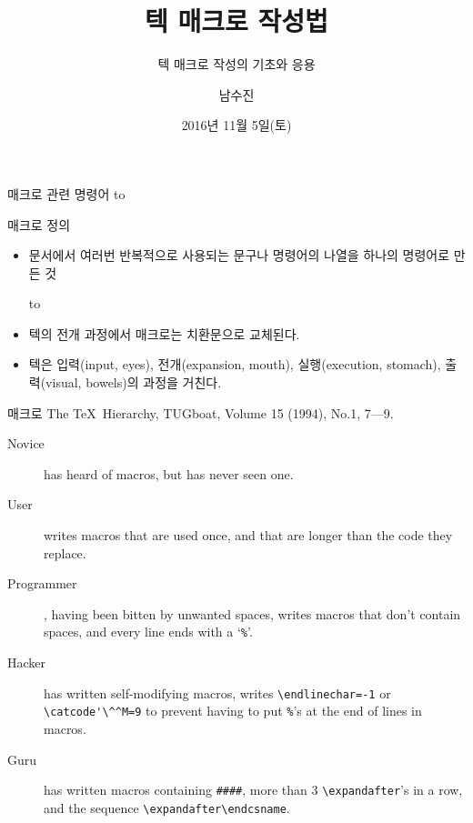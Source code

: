 \documentclass{beamer}
\title{텍 매크로 작성법}
\subtitle{텍 매크로 작성의 기초와 응용}
\author{남수진}
\date{2016년 11월 5일(토)}
\institute{
  2016 공주대학교 문서작성 워크숍 2016\\
  공주대학교 인문사회과학관 1층 컴퓨터실 107호}
\begin{document}
\maketitle


%
\begin{frame}{매크로 관련 명령어}
  \vspace{4mm}
  \hbox to
\end{frame}


%
\begin{frame}[fragile]{매크로 정의}
  \begin{itemize}
  \item 문서에서 여러번 반복적으로 사용되는 문구나 명령어의 나열을 하나의 명령어로 만든 것
    
    \medskip
    \hbox to
    \medskip
  \item 텍의 전개 과정에서 매크로는 치환문으로 교체된다.
  \item 텍은 입력(input, eyes), 전개(expansion, mouth),
    실행(execution, stomach), 출력(visual, bowels)의 과정을 거친다.
  \end{itemize}
\end{frame}


%
\begin{frame}[fragile]{매크로}
  The \TeX\ Hierarchy, TUGboat, Volume 15 (1994), No.1, 7---9.
  \begin{description}
  \item [Novice] has heard of macros, but has never seen one.
  \item [User] writes macros that are used once, and that are
    longer than the code they replace.
  \item [Programmer], having been bitten by unwanted spaces,
    writes macros that don't contain spaces, and every line ends with
    a `{\small\verb+%+}'.
  \item [Hacker] has written self-modifying macros, writes
    {\small\verb+\endlinechar=-1+} or {\small\verb+\catcode'\^^M=9+}
    to prevent having to put {\small\verb+%+}'s at the end of lines in macros.
  \item [Guru] has written macros containing {\small\verb+####+}, more than 3
    {\small\verb+\expandafter+}'s in a row, and the sequence
    {\small\verb+\expandafter\endcsname+}.
  \end{description}
\end{frame}
\end{document}
